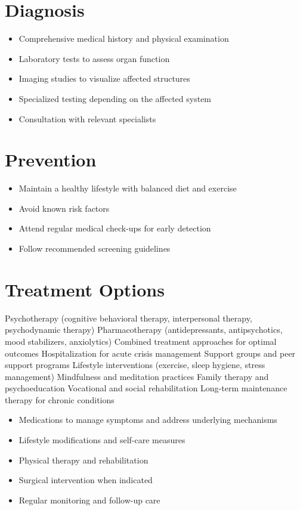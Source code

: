 \section{Diagnosis}
\begin{itemize}[noitemsep]
  \item Comprehensive medical history and physical examination
  \item Laboratory tests to assess organ function
  \item Imaging studies to visualize affected structures
  \item Specialized testing depending on the affected system
  \item Consultation with relevant specialists
\end{itemize}
\section{Prevention}
\begin{itemize}[noitemsep]
  \item Maintain a healthy lifestyle with balanced diet and exercise
  \item Avoid known risk factors
  \item Attend regular medical check-ups for early detection
  \item Follow recommended screening guidelines
\end{itemize}
\section{Treatment Options}
Psychotherapy (cognitive behavioral therapy, interpersonal therapy, psychodynamic therapy) Pharmacotherapy (antidepressants, antipsychotics, mood stabilizers, anxiolytics) Combined treatment approaches for optimal outcomes Hospitalization for acute crisis management Support groups and peer support programs Lifestyle interventions (exercise, sleep hygiene, stress management) Mindfulness and meditation practices Family therapy and psychoeducation Vocational and social rehabilitation Long-term maintenance therapy for chronic conditions

\begin{itemize}[noitemsep]
  \item Medications to manage symptoms and address underlying mechanisms
  \item Lifestyle modifications and self-care measures
  \item Physical therapy and rehabilitation
  \item Surgical intervention when indicated
  \item Regular monitoring and follow-up care
\end{itemize}
